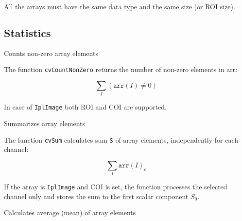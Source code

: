 All the arrays must have the same data type and the same size (or ROI size).

\subsection{Statistics}

\label{CountNonZero}

Counts non-zero array elements


\begin{description}
\end{description}


The function \texttt{cvCountNonZero} returns the number of non-zero elements in arr:

\[ \sum_I (\texttt{arr}(I) \ne 0) \]

In case of \texttt{IplImage} both ROI and COI are supported.


\label{Sum}

Summarizes array elements


\begin{description}
\end{description}


The function \texttt{cvSum} calculates sum \texttt{S} of array elements, independently for each channel:

\[ \sum_I \texttt{arr}(I)_c \]

If the array is \texttt{IplImage} and COI is set, the function processes the selected channel only and stores the sum to the first scalar component $S_0$.

\label{Avg}

Calculates average (mean) of array elements


\begin{description}
\end{description}


